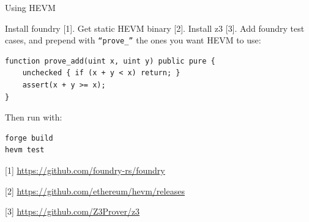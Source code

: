 \documentclass[aspectratio=169]{beamer}
\begin{document}
\begin{frame}[fragile=singleslide]{Using HEVM}

Install foundry [1]. Get static HEVM binary [2]. Install z3 [3]. Add foundry test cases, and prepend with \texttt{``prove\_''} the ones you want HEVM to use:

\begin{Verbatim}[frame=single, framerule=0.2mm, framesep=2mm,fontsize=\footnotesize]
function prove_add(uint x, uint y) public pure {
    unchecked { if (x + y < x) return; }
    assert(x + y >= x);
}
\end{Verbatim}

Then run with:

\begin{Verbatim}[frame=single, framerule=0.2mm, framesep=2mm,fontsize=\footnotesize]
forge build
hevm test
\end{Verbatim}


\bigskip

[1] \url{https://github.com/foundry-rs/foundry}

[2] \url{https://github.com/ethereum/hevm/releases}

[3] \url{https://github.com/Z3Prover/z3}
\end{frame}


%


%
%
%
%
%
%
\end{document}

